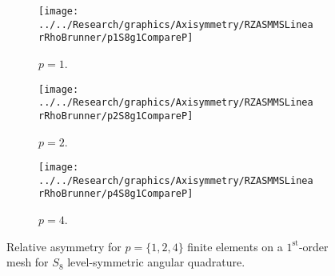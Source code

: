 \documentclass[12pt]{article}
\begin{document}
\begin{sidewaysfigure}[!htb]
\centering
\begin{subfigure}{0.33\textwidth}
\texttt{[image: ../../Research/graphics/Axisymmetry/RZASMMSLinearRhoBrunner/p1S8g1CompareP]}
\caption{$p=1$.}
\end{subfigure}%
\begin{subfigure}{0.33\textwidth}
\texttt{[image: ../../Research/graphics/Axisymmetry/RZASMMSLinearRhoBrunner/p2S8g1CompareP]}
\caption{$p=2$.}
\end{subfigure}%
\begin{subfigure}{0.33\textwidth}
\texttt{[image: ../../Research/graphics/Axisymmetry/RZASMMSLinearRhoBrunner/p4S8g1CompareP]}
\caption{$p=4$.}
\end{subfigure}
\caption{Relative asymmetry for $p=\{1,2,4\}$ finite elements on a $1^\text{st}$-order mesh for $S_8$ level-symmetric angular quadrature.}
\label{fig:RZASMMSLinearRhoBrunnerg1CompareP}
\end{sidewaysfigure}
\end{document}
